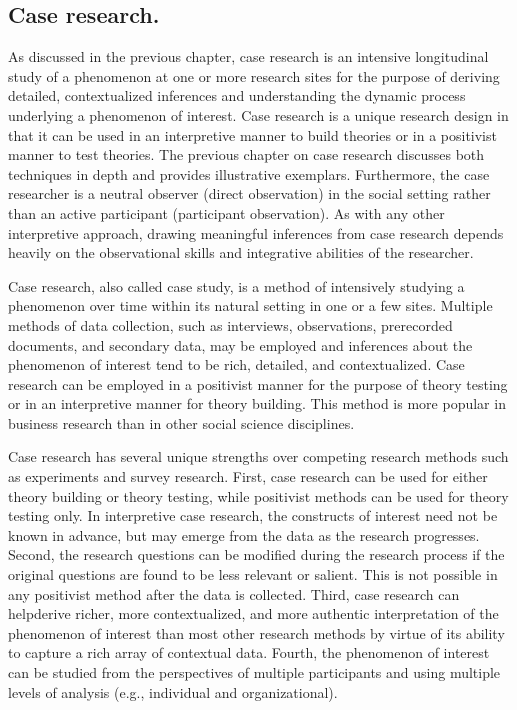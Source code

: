 \subsection{Case research.} As discussed in the previous chapter, case research is an intensive longitudinal study of a phenomenon at one or more research sites for the purpose of deriving detailed, contextualized inferences and understanding the dynamic process underlying a phenomenon of interest. Case research is a unique research design in that it can be used in an interpretive manner to build theories or in a positivist manner to test theories. The previous chapter on case research discusses both techniques in depth and provides illustrative exemplars. Furthermore, the case researcher is a neutral observer (direct observation) in the social setting rather than an active participant (participant observation). As with any other interpretive approach, drawing meaningful inferences from case research depends heavily on the observational skills and integrative abilities of the researcher.

Case research, also called case study, is a method of intensively studying a phenomenon over time within its natural setting in one or a few sites. Multiple methods of data collection, such as interviews, observations, prerecorded documents, and secondary data, may be employed and inferences about the phenomenon of interest tend to be rich, detailed, and contextualized. Case research can be employed in a positivist manner for the purpose of theory testing or in an interpretive manner for theory building. This method is more popular in business research than in other social science disciplines.

Case research has several unique strengths over competing research methods such as experiments and survey research. First, case research can be used for either theory building or theory testing, while positivist methods can be used for theory testing only. In interpretive case research, the constructs of interest need not be known in advance, but may emerge from the data as the research progresses. Second, the research questions can be modified during the research process if the original questions are found to be less relevant or salient. This is not possible in any positivist method after the data is collected. Third, case research can helpderive richer, more contextualized, and more authentic interpretation of the phenomenon of interest than most other research methods by virtue of its ability to capture a rich array of contextual data. Fourth, the phenomenon of interest can be studied from the perspectives of multiple participants and using multiple levels of analysis (e.g., individual and organizational).


